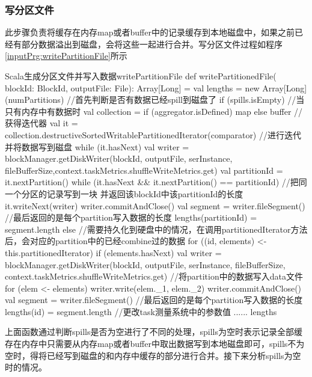 \subsubsection{写分区文件}
此步骤负责将缓存在内存map或者buffer中的记录缓存到本地磁盘中，如果之前已经有部分数据溢出到磁盘，会将这些一起进行合并。写分区文件过程如程序\ref{inputPrg:writePartitionFile}所示
\begin{codeInput}{Scala}{生成分区文件并写入数据}{writePartitionFile}
def writePartitionedFile(
blockId: BlockId,
outputFile: File): Array[Long] = {
  val lengths = new Array[Long](numPartitions)
  //首先判断是否有数据已经spill到磁盘了
  if (spills.isEmpty) {
    //当只有内存中有数据时
    val collection = if (aggregator.isDefined) map else buffer
    // 获得迭代器
    val it = collection.destructiveSortedWritablePartitionedIterator(comparator)
    //进行迭代并将数据写到磁盘
    while (it.hasNext) {
      val writer = blockManager.getDiskWriter(blockId, outputFile, serInstance, fileBufferSize,context.taskMetrics.shuffleWriteMetrics.get)
      val partitionId = it.nextPartition()
      while (it.hasNext && it.nextPartition() == partitionId) {
        //把同一个分区的记录写到一块 并返回该blockId中该partitionId的长度
        it.writeNext(writer)
      }
      writer.commitAndClose()
      val segment = writer.fileSegment()
      //最后返回的是每个partition写入数据的长度
      lengths(partitionId) = segment.length
    }
  } else {
    //需要持久化到硬盘中的情况，在调用partitionedIterator方法后，会对应的partition中的已经combine过的数据
    for ((id, elements) <- this.partitionedIterator) {
      if (elements.hasNext) {
        val writer = blockManager.getDiskWriter(blockId, outputFile, serInstance, fileBufferSize,
        context.taskMetrics.shuffleWriteMetrics.get)
        //将partition中的数据写入data文件
        for (elem <- elements) {
          writer.write(elem._1, elem._2)
        }
        writer.commitAndClose()
        val segment = writer.fileSegment()
        //最后返回的是每个partition写入数据的长度
        lengths(id) = segment.length
      }
    }
  }
//更改task测量系统中的参数值
......
lengths
}
\end{codeInput}

上面函数通过判断spills是否为空进行了不同的处理，spills为空时表示记录全部缓存在内存中只需要从内存map或者buffer中取出数据写到本地磁盘即可，spills不为空时，得将已经写到磁盘的和内存中缓存的部分进行合并。接下来分析spills为空时的情况。

